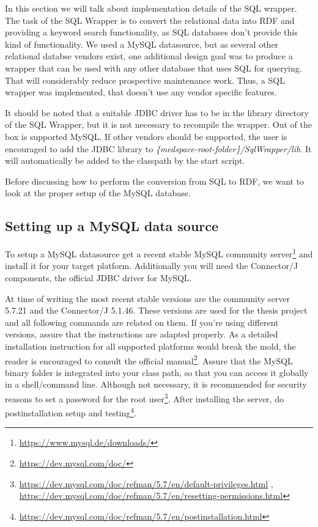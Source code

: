 In this section we will talk about implementation details of the SQL wrapper. 
The task of the SQL Wrapper is to convert the relational data into RDF and providing a keyword search functionality, as SQL databases don't provide this kind of  functionality.
We used a MySQL datasource, but as several other relational databse vendors exist, one additional design goal was to produce a wrapper that can be used with any other database that uses SQL for querying. That will considerably reduce prospective maintenance work.
Thus, a SQL wrapper was implemented, that doesn't use any vendor specific features. 

It should be noted that a suitable JDBC driver has to be in the library directory of the SQL Wrapper, but it is not necessary to recompile the wrapper. Out of the box is supported MySQL. If other vendors should be supported, the user is encouraged to add the JDBC library to \emph{\{medspace-root-folder\}/SqlWrapper/lib}. It will automatically be added to the classpath by the start script.

Before discussing how to perform the conversion from SQL to RDF, we want to look at the proper setup of the MySQL database.



\subsection{Setting up a MySQL data source}

To setup a MySQL datasource get a recent stable MySQL community server\footnote{\url{https://www.mysql.de/downloads/}} 
and install it for your target platform. Additionally you will need the Connector/J components, the official JDBC driver for MySQL. 

At time of writing the most recent stable versions are the community server 5.7.21 and the Connector/J 5.1.46. These versions are used for the thesis project and all following commands are related on them. If you're using 
different versions, assure that the instructions are adapted properly. As a detailed installation instruction for all supported platforms would break the mold, the reader is encouraged to consult the official 
manual\footnote{\url{https://dev.mysql.com/doc/}}. 
Assure that the MySQL binary folder is integrated into your class path, so that you can access it globally in a shell/command line. Although not necessary, it is recommended for security reasons 
to set a password for the root user\footnote{\url{https://dev.mysql.com/doc/refman/5.7/en/default-privileges.html} , \url{https://dev.mysql.com/doc/refman/5.7/en/resetting-permissions.html}}. 
After installing the server, do postinstallation setup and testing\footnote{\url{https://dev.mysql.com/doc/refman/5.7/en/postinstallation.html}}. 

